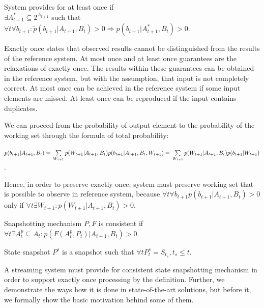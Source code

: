 \begin{definition}{System provides for at least once}
if \\
$\exists{A^{*}_{t+1}\subseteq{2^{A_{t+1}}}}$ such that \\
$\forall{t} \forall{b_{t+1}}: \widetilde{p}(b_{t+1}|A_{t+1},B_t)>0 \Rightarrow p(b_{t+1}|A^{*}_{t+1},B_t)>0$.
\end{definition}

Exactly once states that observed results cannot be distinguished from the results of the reference system. At most once and at least once guarantees are the relaxations of exactly once. The results within these guarantees can be obtained in the reference system, but with the assumption, that input is not completely correct. At most once can be achieved in the reference system if some input elements are missed. At least once can be reproduced if the input contains duplicates. 

We can proceed from the probability of output element to the probability of the working set through the formula of total probability:

$p(b_{t+1}|A_{t+1},B_t)=\\
\sum\limits_{W_{t+1}}p(W_{t+1}|A_{t+1},B_t)p(b_{t+1}|A_{t+1},B_t,W_{t+1})=\\
\sum\limits_{W_{t+1}}p(W_{t+1}|A_{t+1},B_t)p(b_{t+1}|W_{t+1})
$.

Hence, in order to preserve exactly once, system must preserve working set that is possible to observe in reference system, because $\forall{t} \forall{b_{t+1}} p(b_{t+1}|A_{t+1},B_t)>0$ only if $\forall{t} \exists{W_{t+1}}:p(W_{t+1}|A_{t+1},B_t)>0$.

\begin{definition}{Snapshotting mechanism $P,F$ is consistent}
if $\forall{t} \exists{A^{p}_t\subseteq{A_t}} : p(F(A^{p}_t,P_t)|A_{t+1},B_t)>0$.
\end{definition}


\begin{definition}{State snapshot}
$P^{s}$ is a snapshot such that $\forall{t} P^{s}_t = S_{t_s},t_s \leq t$.
\end{definition}

A streaming system must provide for consistent state snapshotting mechanism in order to support exactly once processing by the definition. Further, we demonstrate the ways how it is done in state-of-the-art solutions, but before it, we formally show the basic motivation behind some of them. 

